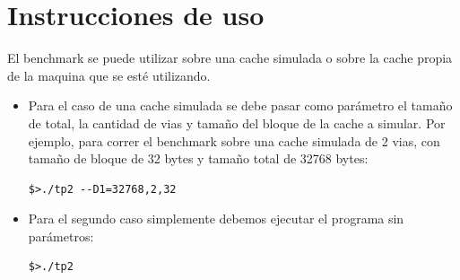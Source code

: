 \documentclass[a4paper,10pt]{article}
\begin{document}
\section{Instrucciones de uso}
El benchmark se puede utilizar sobre una cache simulada o sobre la cache propia de la maquina que se est\'e utilizando.\\
\begin{itemize}
\item 
Para el caso de una cache simulada se debe pasar como par\'ametro el tama\~no de total, la cantidad de vias y tama\~no del bloque de la cache a simular. Por ejemplo, para correr el benchmark sobre una cache simulada de 2 vias, con tama\~no de bloque de 32 bytes y tama\~no total de 32768 bytes:
\begin{verbatim}
$>./tp2 --D1=32768,2,32
\end{verbatim}

\item 
Para el segundo caso simplemente debemos ejecutar el programa sin par\'ametros:
\begin{verbatim}
$>./tp2
\end{verbatim}

\end{itemize}

\newpage
\end{document}
